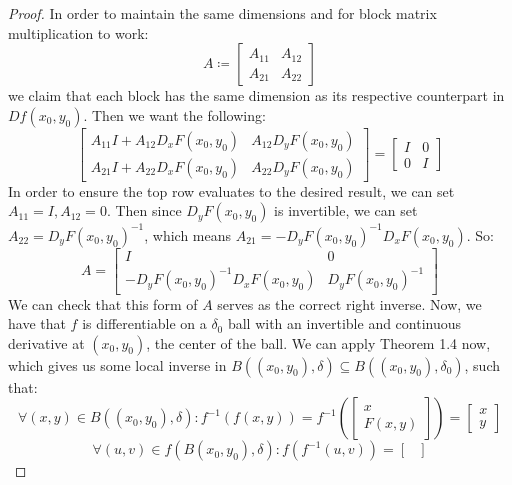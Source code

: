 \documentclass[10pt,letterpaper]{article} %
\begin{document}
\begin{proof}
In order to maintain the same dimensions and for block matrix multiplication to work:
\begin{equation*}
A \coloneq \begin{bmatrix}
A_{11} & A_{12}\\
A_{21} & A_{22}
\end{bmatrix}
\end{equation*}
we claim that each block has the same dimension as its respective counterpart in $Df(x_0, y_0)$. Then we want the following:
\begin{equation*}
\begin{bmatrix}
A_{11}I + A_{12}D_xF(x_0, y_0) & A_{12}D_yF(x_0, y_0)\\
A_{21}I + A_{22}D_xF(x_0, y_0) & A_{22}D_yF(x_0, y_0)
\end{bmatrix} = \begin{bmatrix}
I & 0\\
0 & I
\end{bmatrix}
\end{equation*}
In order to ensure the top row evaluates to the desired result, we can set $A_{11} = I, A_{12} = 0$. Then since $D_yF(x_0, y_0)$ is invertible, we can set $A_{22} = D_yF(x_0, y_0)^{-1}$, which means $A_{21} = - D_yF(x_0, y_0)^{-1}D_xF(x_0, y_0)$. So:
\begin{equation*}
A = \begin{bmatrix}
I & 0\\
- D_yF(x_0, y_0)^{-1}D_xF(x_0, y_0) & D_yF(x_0, y_0)^{-1}
\end{bmatrix}
\end{equation*}
We can check that this form of $A$ serves as the correct right inverse. Now, we have that $f$ is differentiable on a $\delta_0$ ball with an invertible and continuous derivative at $(x_0, y_0)$, the center of the ball. We can apply Theorem 1.4 now, which gives us some local inverse in $B((x_0, y_0), \delta) \subseteq B((x_0, y_0), \delta_0)$, such that:
\begin{equation*}
\forall (x, y) \in B((x_0, y_0), \delta): f^{-1}(f(x, y)) = f^{-1}\left(\begin{bmatrix}
    x\\F(x, y)
\end{bmatrix}\right) = \begin{bmatrix}
    x\\y
\end{bmatrix}
\end{equation*}
\begin{equation*}
\forall (u, v) \in f(B(x_0, y_0), \delta): f(f^{-1}(u, v)) = \begin{bmatrix}

\end{bmatrix}
\end{equation*}
\end{proof}
\end{document}
